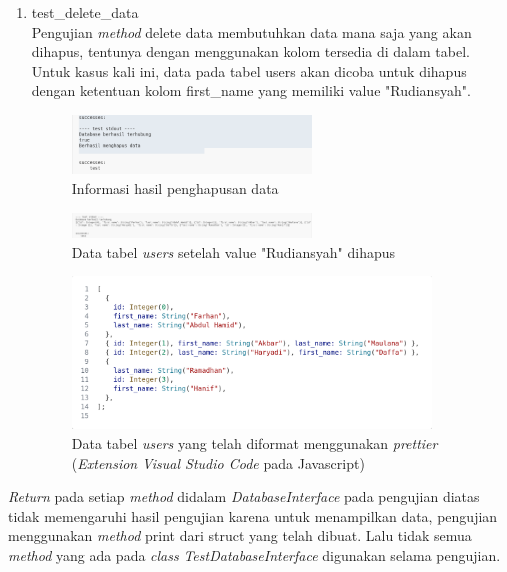 \begin{enumerate}
	\item test\_delete\_data \\
  Pengujian \emph{method} delete data membutuhkan data mana saja yang akan dihapus, tentunya dengan menggunakan kolom tersedia di dalam tabel. Untuk kasus kali ini, data pada tabel users 
  akan dicoba untuk dihapus dengan ketentuan kolom first\_name yang memiliki value "Rudiansyah".
    \begin{figure}[H]
  	\centering{}
	\includegraphics[width=0.6\textwidth]{gambar/bab4/test-delete-data.png}
  	\caption{Informasi hasil penghapusan data}
   \end{figure}
   \begin{figure}[H]
  	\centering{}
	\includegraphics[width=0.6\textwidth]{gambar/bab4/test-hasil-delete.png}
  	\caption{Data tabel \emph{users} setelah value "Rudiansyah" dihapus}
   \end{figure}
  \begin{figure}[H]
  	\centering{}
	\includegraphics[width=0.9\textwidth]{gambar/bab4/test-hasil-delete-beautify.png}
  	\caption{Data tabel \emph{users} yang telah diformat menggunakan \emph{prettier} (\emph{Extension} \emph{Visual Studio Code} pada Javascript)}
   \end{figure}
\end{enumerate}

\emph{Return} pada setiap \emph{method} didalam \emph{DatabaseInterface} pada pengujian diatas tidak memengaruhi hasil pengujian karena 
untuk menampilkan data, pengujian menggunakan \emph{method} print dari struct yang telah dibuat. Lalu tidak semua \emph{method} yang ada pada \emph{class} \emph{TestDatabaseInterface} digunakan selama pengujian.

